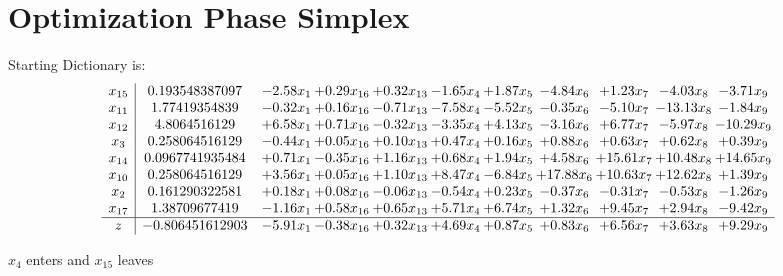 \documentclass[9pt]{article}
\begin{document}
\section{Optimization Phase Simplex}
Starting Dictionary is:
\[\begin{array}{c| c c@{\hskip 2pt} c@{\hskip 2pt} c@{\hskip 2pt} c@{\hskip 2pt} c@{\hskip 2pt} c@{\hskip 2pt} c@{\hskip 2pt} c@{\hskip 2pt} c@{\hskip 2pt} }
 x_{15}   &  0.193548387097 & -2.58 x_{1} & +  0.29 x_{16} & +  0.32 x_{13} & -1.65 x_{4} & +  1.87 x_{5} & -4.84 x_{6} & +  1.23 x_{7} & -4.03 x_{8} & -3.71 x_{9}\\
 x_{11}   &  1.77419354839 & -0.32 x_{1} & +  0.16 x_{16} & -0.71 x_{13} & -7.58 x_{4} & -5.52 x_{5} & -0.35 x_{6} & -5.10 x_{7} & -13.13 x_{8} & -1.84 x_{9}\\
 x_{12}   &  4.8064516129 & +  6.58 x_{1} & +  0.71 x_{16} & -0.32 x_{13} & -3.35 x_{4} & +  4.13 x_{5} & -3.16 x_{6} & +  6.77 x_{7} & -5.97 x_{8} & -10.29 x_{9}\\
 x_{3}   &  0.258064516129 & -0.44 x_{1} & +  0.05 x_{16} & +  0.10 x_{13} & +  0.47 x_{4} & +  0.16 x_{5} & +  0.88 x_{6} & +  0.63 x_{7} & +  0.62 x_{8} & +  0.39 x_{9}\\
 x_{14}   &  0.0967741935484 & +  0.71 x_{1} & -0.35 x_{16} & +  1.16 x_{13} & +  0.68 x_{4} & +  1.94 x_{5} & +  4.58 x_{6} & + 15.61 x_{7} & + 10.48 x_{8} & + 14.65 x_{9}\\
 x_{10}   &  0.258064516129 & +  3.56 x_{1} & +  0.05 x_{16} & +  1.10 x_{13} & +  8.47 x_{4} & -6.84 x_{5} & + 17.88 x_{6} & + 10.63 x_{7} & + 12.62 x_{8} & +  1.39 x_{9}\\
 x_{2}   &  0.161290322581 & +  0.18 x_{1} & +  0.08 x_{16} & -0.06 x_{13} & -0.54 x_{4} & +  0.23 x_{5} & -0.37 x_{6} & -0.31 x_{7} & -0.53 x_{8} & -1.26 x_{9}\\
 x_{17}   &  1.38709677419 & -1.16 x_{1} & +  0.58 x_{16} & +  0.65 x_{13} & +  5.71 x_{4} & +  6.74 x_{5} & +  1.32 x_{6} & +  9.45 x_{7} & +  2.94 x_{8} & -9.42 x_{9}\\
\hline
z    &  -0.806451612903 & -5.91 x_{1} & -0.38 x_{16} & +  0.32 x_{13} & +  4.69 x_{4} & +  0.87 x_{5} & +  0.83 x_{6} & +  6.56 x_{7} & +  3.63 x_{8} & +  9.29 x_{9}\\
\end{array}\]


 $ x_{4} $ enters and $ x_{15} $ leaves 
\end{document}
